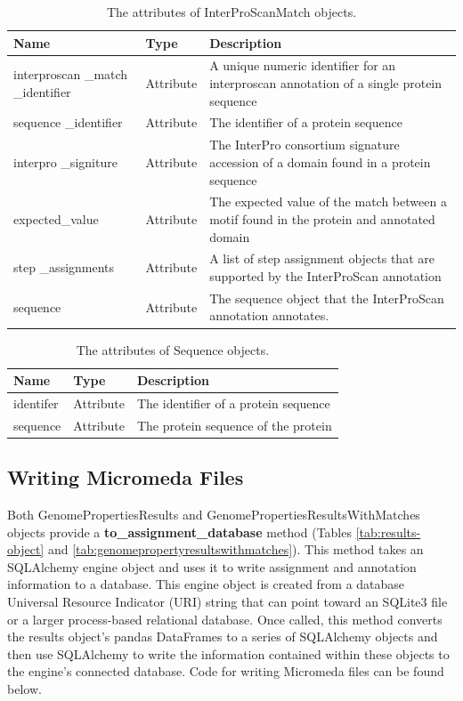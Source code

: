 \begin{table}[!ht]
\centering
\caption{The attributes of InterProScanMatch objects.}
\label{tab:interproscanannotationobject}
\begin{tabular}{|p{2.7cm}|p{2cm}|p{10cm}|}
\hline
\textbf{Name} & \textbf{Type} & \textbf{Description} \\ \hline
interproscan \_match \_identifier & Attribute & A unique numeric identifier for an interproscan annotation of a single protein sequence \\ \hline
sequence \_identifier & Attribute & The identifier of a protein sequence \\ \hline
interpro \_signiture & Attribute & The InterPro consortium signature accession of a domain found in a protein sequence \\ \hline
expected\_value & Attribute & The expected value of the match between a motif found in the protein and annotated domain \\ \hline
step \_assignments & Attribute & A list of step assignment objects that are supported by the InterProScan annotation \\ \hline
sequence & Attribute & The sequence object that the InterProScan annotation annotates. \\ \hline
\end{tabular}
\end{table}

\begin{table}[!ht]
\centering
\caption{The attributes of Sequence objects.}
\label{tab:sequenceobject}
\begin{tabular}{|p{2.7cm}|p{2cm}|p{10cm}|}
\hline
\textbf{Name} & \textbf{Type} & \textbf{Description} \\ \hline
identifer & Attribute & The identifier of a protein sequence \\ \hline
sequence & Attribute & The protein sequence of the protein \\ \hline
\end{tabular}
\end{table}

\subsection{Writing Micromeda Files}

Both GenomePropertiesResults and GenomePropertiesResultsWithMatches objects provide a \textbf{to\_assignment\_database} method (Tables \ref{tab:results-object} and \ref{tab:genomepropertyresultswithmatches}). This method takes an SQLAlchemy engine object and uses it to write assignment and annotation information to a database. This engine object is created from a database Universal Resource Indicator (URI) \cite{berners1998uniform} string that can point toward an SQLite3 file or a larger process-based relational database. Once called, this method converts the results object's pandas DataFrames to a series of SQLAlchemy objects and then use SQLAlchemy to write the information contained within these objects to the engine's connected database. Code for writing Micromeda files can be found below.

